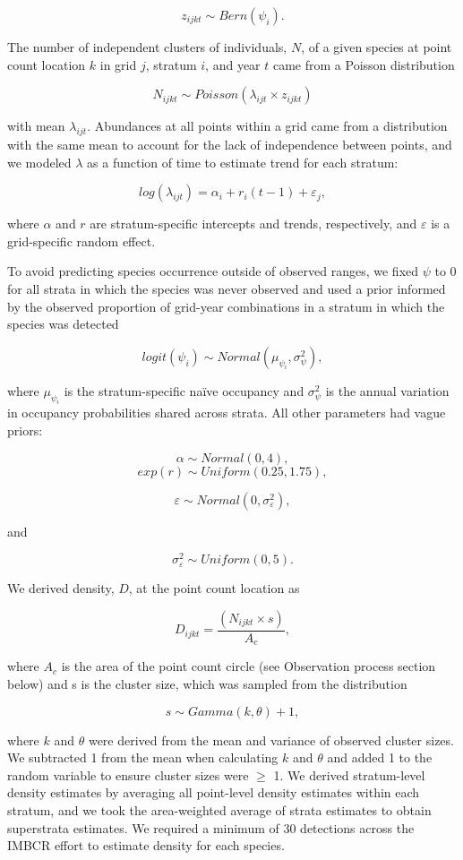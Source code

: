 \documentclass[
  letterpaper,
  DIV=11,
  numbers=noendperiod,
  oneside]{scrreprt}
\begin{document}
\[z_{ijkt} \sim Bern(ψ_{i}).\]

The number of independent clusters of individuals, \(N\), of a given
species at point count location \(k\) in grid \(j\), stratum \(i\), and
year \(t\) came from a Poisson distribution

\[N_{ijkt}\sim Poisson(λ_{ijt}×z_{ijkt})\]

with mean \(λ_{ijt}\). Abundances at all points within a grid came from
a distribution with the same mean to account for the lack of
independence between points, and we modeled \(λ\) as a function of time
to estimate trend for each stratum:

\[log⁡(λ_{ijt}) = α_{i}+r_{i} (t-1)+ε_{j},\]

where \(α\) and \(r\) are stratum-specific intercepts and trends,
respectively, and \(ε\) is a grid-specific random effect.

To avoid predicting species occurrence outside of observed ranges, we
fixed \(ψ\) to 0 for all strata in which the species was never observed
and used a prior informed by the observed proportion of grid-year
combinations in a stratum in which the species was detected

\[logit(ψ_{i }) \sim Normal(μ_{ψ_i},σ_{ψ}^{2}),\]

where \(μ_{ψ_i}\) is the stratum-specific naïve occupancy and
\(σ_{ψ}^{2}\) is the annual variation in occupancy probabilities shared
across strata. All other parameters had vague priors:

\[α\sim Normal(0,4),\] \[exp⁡(r) \sim Uniform(0.25,1.75),\]

\[ε\sim Normal(0,σ_{ε}^{2}),\]

and

\[σ_{ε}^{2}\sim Uniform(0,5).\]

We derived density, \(D\), at the point count location as

\[D_{ijkt} = \frac {(N_{ijkt}×s)}{A_{c}} ,\]

where \(A_{c}\) is the area of the point count circle (see Observation
process section below) and s is the cluster size, which was sampled from
the distribution

\[s\sim Gamma(k,θ)+1,\]

where \(k\) and \(θ\) were derived from the mean and variance of
observed cluster sizes. We subtracted 1 from the mean when calculating
\(k\) and \(θ\) and added 1 to the random variable to ensure cluster
sizes were \(\ge\) 1. We derived stratum-level density estimates by
averaging all point-level density estimates within each stratum, and we
took the area-weighted average of strata estimates to obtain superstrata
estimates. We required a minimum of 30 detections across the IMBCR
effort to estimate density for each species.
\end{document}
